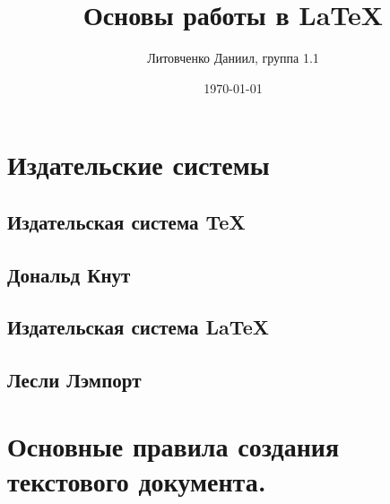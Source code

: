 \documentclass[a4paper,12pt]{article} %
\author{Литовченко Даниил, группа 1.1}
\title{Основы работы в \LaTeX{}}
\date{\today}
\begin{document}
\section{Издательские системы}  
\newpage
\subsection{Издательская система TeX}
\newpage
\subsection{Дональд Кнут}
\newpage
\subsection{Издательская система \LaTeX{}}
\newpage
\subsection{Лесли Лэмпорт}
\newpage
\section{Основные правила создания текстового документа.} 
\newpage
\end{document}
